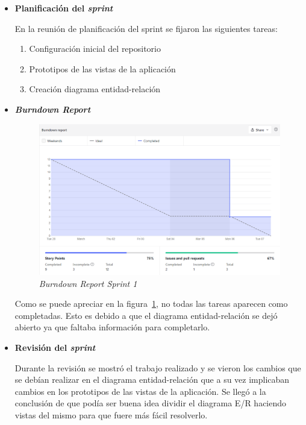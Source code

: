 \begin{itemize}
\item\textbf{Planificación del \textit{sprint}}

En la reunión de planificación del sprint se fijaron las siguientes tareas:
\begin{enumerate}
	\item Configuración inicial del repositorio
	\item Prototipos de las vistas de la aplicación
	\item Creación diagrama entidad-relación
\end{enumerate}

\item\textbf{\textit{Burndown Report}}

\begin{figure}
	\centering
	\includegraphics[width=\textwidth]{../img/Anexos/Sprints/Sprint1.png}
	\caption{\textit{Burndown Report Sprint 1}}\label{ReportSprint1}
\end{figure}

Como se puede apreciar en la figura~\ref{ReportSprint1}, no todas las tareas aparecen como completadas. Esto es debido a que el diagrama entidad-relación se dejó abierto ya que faltaba información para completarlo.

\item\textbf{Revisión del \textit{sprint}}

Durante la revisión se mostró el trabajo realizado y se vieron los cambios que se debían realizar en el diagrama entidad-relación que a su vez implicaban cambios en los prototipos de las vistas de la aplicación.
Se llegó a la conclusión de que podía ser buena idea dividir el diagrama E/R haciendo vistas del mismo para que fuere más fácil resolverlo.
\end{itemize}


